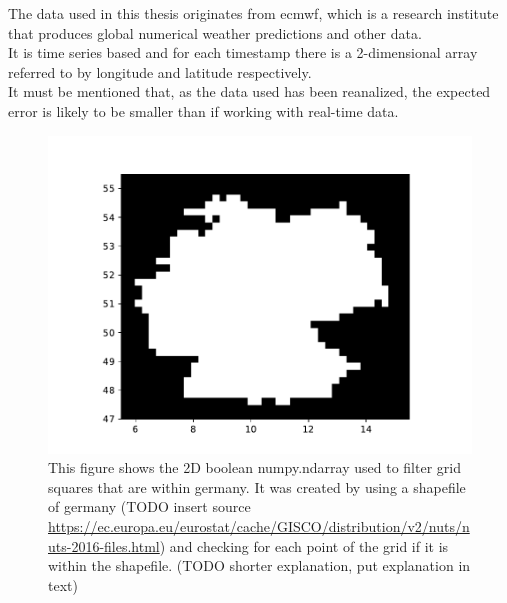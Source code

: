 The data used in this thesis originates from \acrshort{ecmwf}, which is a research institute that produces global numerical weather predictions and other data.\\
It is time series based and for each timestamp there is a 2-dimensional array referred to by longitude and latitude respectively.\\

It must be mentioned that, as the data used has been reanalized, the expected error is likely to be smaller than if working with real-time data.\\

\begin{figure}[h!]%
\centering
\includegraphics[width=.7\columnwidth]{plots/isin}%
\caption{This figure shows the 2D boolean numpy.ndarray used to filter grid squares that are within germany. It was created by using a shapefile of germany (TODO insert source \url{https://ec.europa.eu/eurostat/cache/GISCO/distribution/v2/nuts/nuts-2016-files.html}) and checking for each point of the grid if it is within the shapefile. (TODO shorter explanation, put explanation in text)}%
\label{fig:isin}%
\end{figure}


